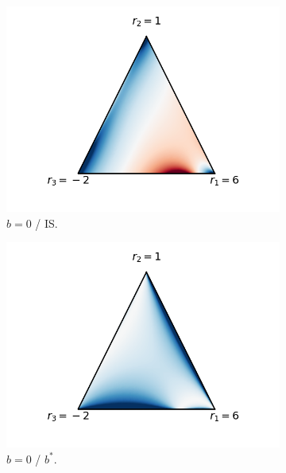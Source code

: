 \begin{figure}[t!]
\begin{center}
\begin{subfigure}[b]{0.08\linewidth}
    \label{fig:vary_corr}
  \end{subfigure}
  \begin{subfigure}[b]{.27\linewidth}
    \includegraphics[trim={2cm 1.5cm 2cm 0mm},clip, width=\textwidth]{articles/baselines/figs/simplex_plots/v_vs_is.png}
    \caption{{\color{myred}$b=0$} / {\color{myblue}IS}.}
  \end{subfigure}
  \begin{subfigure}[b]{0.27\linewidth}
    \includegraphics[trim={2cm 1.5cm 2cm 0},clip,width=\textwidth]{articles/baselines/figs/simplex_plots/v_vs_b.png}
    \caption{{\color{myred}$b=0$} / {\color{myblue}$b^\ast$}.}
  \end{subfigure}
  \begin{subfigure}[b]{0.27\linewidth}

\end{subfigure}
\end{center}
\end{figure}
